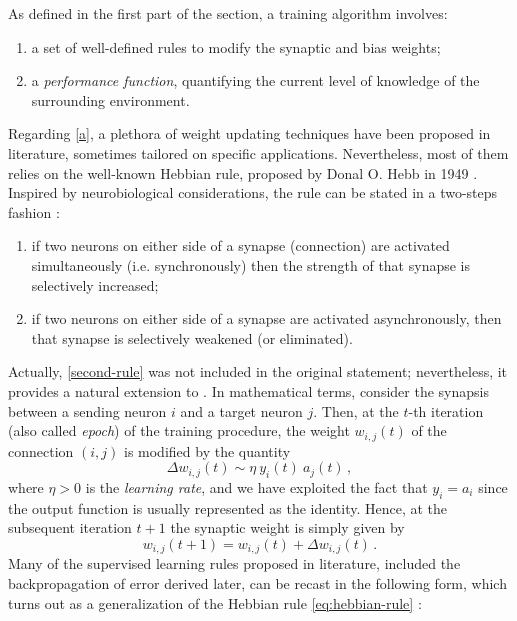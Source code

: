 \documentclass[11pt, a4paper]{report}
\numberwithin{equation}{chapter}
\theoremstyle{theorem}
\theoremstyle{definition}
\numberwithin{figure}{section}
\begin{document}
		As defined in the first part of the section, a training algorithm involves:
		\begin{enumerate}[label=(\alph*)]
			\item a set of well-defined rules to modify the synaptic and bias weights;
			\label{a}
			\item a \emph{performance function}, quantifying the current level of knowledge of the surrounding environment.
			\label{b}
		\end{enumerate}
		Regarding \ref{a}, a plethora of weight updating techniques have been proposed in literature, sometimes tailored on specific applications. Nevertheless, most of them relies on the well-known Hebbian rule, proposed by Donal O. Hebb in 1949 \cite{Heb49}. Inspired by neurobiological considerations, the rule can be stated in a two-steps fashion \cite{Hay05}:
		\begin{enumerate}[label=(\roman*)]
			\item if two neurons on either side of a synapse (connection) are activated simultaneously (i.e. synchronously) then the strength of that synapse is selectively increased;
			\label{first-rule}
			\item if two neurons on either side of a synapse are activated asynchronously, then that synapse is selectively weakened (or eliminated).
			\label{second-rule}
		\end{enumerate}
		Actually, \ref{second-rule} was not included in the original statement; nevertheless, it provides a natural extension to \label{first-rule} \cite{Hay05}.
		In mathematical terms, consider the synapsis between a sending neuron $i$ and a target neuron $j$. Then, at the $t$-th iteration (also called \emph{epoch}) of the training procedure, the weight $w_{i,j}(t)$ of the connection $(i,j)$ is modified by the quantity
		\begin{equation}
			\label{eq:hebbian-rule}
			\Delta w_{i,j}(t) \sim \eta ~ y_i(t) ~ a_j(t) \, ,
		\end{equation}
		where $\eta > 0$ is the \emph{learning rate}, and we have exploited the fact that $y_i = a_i$ since the output function is usually represented as the identity. Hence, at the subsequent iteration $t+1$ the synaptic weight is simply given by
		\begin{equation}
			\label{eq:weight-update}
			w_{i,j}(t+1) = w_{i,j}(t) + \Delta w_{i,j}(t) \, .
		\end{equation}
		Many of the supervised learning rules proposed in literature, included the backpropagation of error derived later, can be recast in the following form, which turns out as a generalization of the Hebbian rule \eqref{eq:hebbian-rule} \cite{Kri}:
\end{document}
